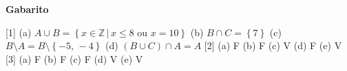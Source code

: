 \documentclass[12pt,a4paper]{article}
\begin{document}
\begin{center}
  \textbf{Gabarito}
\end{center}

[1] (a) $A\cup B = \left\{x\in\mathbb{Z} \,|\, x \leq 8\textrm{ ou } x = 10\right\}$
 (b) $B\cap C = \left\{7\right\}$
 (c) $B\setminus A = B\setminus \left\{-5,\,-4\right\}$
 (d) $(B\cup C)\cap A = A$ 
[2] (a) F (b) F (c) V (d) F (e) V 
[3] (a) F (b) F (c) F (d) V (e) V 
\end{document}
